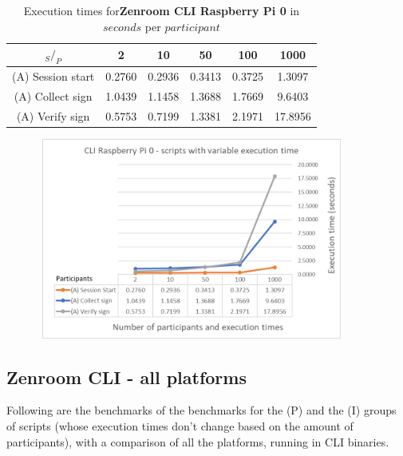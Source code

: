 \documentclass[twocolumn]{article}
\begin{document}
\begin{table}[h!]
  \begin{center}
    \caption{Execution times for\textbf{Zenroom CLI Raspberry Pi 0} in $seconds$ per $participant$}
      \label{tab:table1}
        \begin{tabular} {c|c|c|c|c|c}
          \toprule
           \textbf{$_S / _P$} & \textbf{2} & \textbf{10} & \textbf{50} & \textbf{100} & \textbf{1000} \\
          \midrule
          (A) Session start & 0.2760 & 0.2936 & 0.3413 & 0.3725 & 1.3097 \\
          (A) Collect sign & 1.0439 & 1.1458 & 1.3688 & 1.7669 & 9.6403 \\
          (A) Verify sign & 0.5753 & 0.7199 & 1.3381 & 2.1971 & 17.8956 \\
      \bottomrule %
    \end{tabular}
  \end{center}
\end{table}

\begin{figure}[h!]
    \centering
    \includegraphics[width=4in, height=2.6in]{graphs/CLIRaspi0.png}
    \label{fig:galaxy}
\end{figure}


\subsection*{Zenroom CLI - all platforms}

Following are the benchmarks of the benchmarks for the (P) and the (I) groups of scripts (whose execution times don't change based on the amount of participants), with a comparison of all the platforms, running in CLI binaries.
\end{document}
